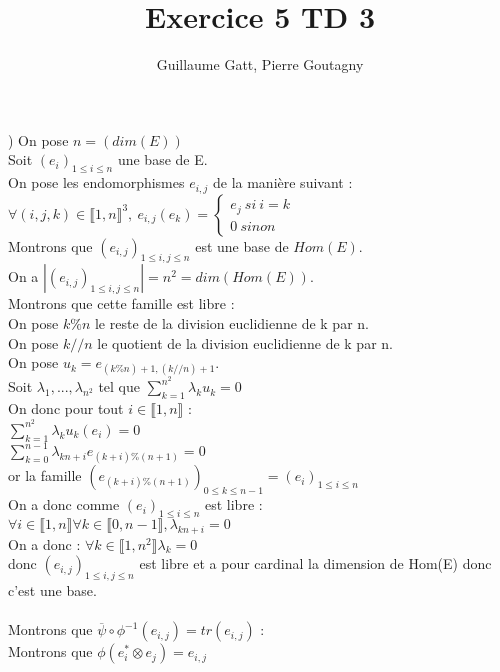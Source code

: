 \documentclass{article}
\begin{document}
\title{Exercice 5 TD 3}
\author{Guillaume Gatt, Pierre Goutagny}
) On pose $n=(dim(E))$ \\
Soit $(e_i)_{ 1\leq i \leq n}$ une base de E. \\
On pose les endomorphismes $e_{i,j}$ de la manière suivant : \\
$\forall (i,j,k) \in \llbracket 1,n\rrbracket^3,\ e_{i,j}(e_k)=\begin{cases}
e_j \ si \ i=k \\
0 \ sinon
\end{cases}$ \\
Montrons que $(e_{i,j})_{ 1\leq i,j \leq n}$ est une base de $Hom(E)$. \\
On a $|(e_{i,j})_{ 1\leq i,j \leq n}|=n^2=dim(Hom(E))$. \\
Montrons que cette famille est libre : \\
On pose $k\%n$ le reste de la division euclidienne de k par n. \\
On pose $k//n$ le quotient de la division euclidienne de k par n. \\
On pose $u_k=e_{(k\%n)+1,(k//n)+1}$. \\
Soit $\lambda_1,...,\lambda_{n^2}$ tel que $\sum_{k=1}^{n^2} \lambda_k u_k =0$ \\
On donc pour tout $i \in \llbracket1,n\rrbracket$ : \\
$\sum_{k=1}^{n^2} \lambda_k u_k(e_i) =0$ \\
$\sum_{k=0}^{n-1} \lambda_{kn+i} e_{(k+i)\% (n+1)} =0$ \\
or la famille $(e_{(k+i)\% (n+1)})_{ 0\leq k\leq n-1}=(e_i)_{ 1\leq i\leq n}$ \\
On a donc comme $(e_i)_{ 1\leq i \leq n}$ est libre : \\
$\forall i \in \llbracket1,n\rrbracket \forall k \in \llbracket0,n-1\rrbracket, \lambda_{kn+i}=0$ \\
On a donc :  $\forall k \in \llbracket1,n^2\rrbracket \lambda_k=0$ \\
donc $(e_{i,j})_{ 1\leq i,j \leq n}$ est libre et a pour cardinal la dimension de Hom(E) donc c'est une base. \\ \\
Montrons que $\overline{\psi} \circ \phi^{-1}(e_{i,j})=tr(e_{i,j})$ : \\
Montrons que $\phi(e^\ast_i \otimes e_{j})= e_{i,j}$ \\
\end{document}
